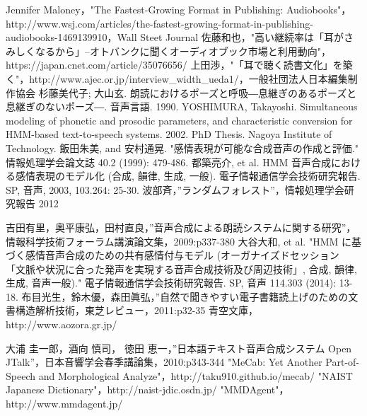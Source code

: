 \begin{thebibliography}{99}

 Jennifer Maloney，"The Fastest-Growing Format in Publishing: Audiobooks"，http://www.wsj.com/articles/the-fastest-growing-format-in-publishing-audiobooks-1469139910，Wall Steet Journal
 佐藤和也，"高い継続率は「耳がさみしくなるから」--オトバンクに聞くオーディオブック市場と利用動向"，https://japan.cnet.com/article/35076656/
 上田渉，"「耳で聴く読書文化」を築く"，http://www.ajec.or.jp/interview\_width\_ueda1/，一般社団法人日本編集制作協会
 杉藤美代子; 大山玄. 朗読におけるポーズと呼吸―息継ぎのあるポーズと息継ぎのないポーズ―. 音声言語. 1990.
 YOSHIMURA, Takayoshi. Simultaneous modeling of phonetic and prosodic parameters, and characteristic conversion for HMM-based text-to-speech systems. 2002. PhD Thesis. Nagoya Institute of Technology.
 飯田朱美, and 安村通晃. "感情表現が可能な合成音声の作成と評価." 情報処理学会論文誌 40.2 (1999): 479-486.
 都築亮介, et al. HMM 音声合成における感情表現のモデル化 (合成, 韻律, 生成, 一般). 電子情報通信学会技術研究報告. SP, 音声, 2003, 103.264: 25-30.
 波部斉，”ランダムフォレスト”，情報処理学会研究報告 2012

 吉田有里，奥平康弘，田村直良，”音声合成による朗読システムに関する研究”，情報科学技術フォーラム講演論文集，2009:p337-380
 大谷大和, et al. "HMM に基づく感情音声合成のための共有感情付与モデル (オーガナイズドセッション 「文脈や状況に合った発声を実現する音声合成技術及び周辺技術」, 合成, 韻律, 生成, 音声一般)." 電子情報通信学会技術研究報告. SP, 音声 114.303 (2014): 13-18.
 布目光生，鈴木優，森田眞弘，”自然で聞きやすい電子書籍読上げのための文書構造解析技術，東芝レビュー，2011:p32-35
 青空文庫，http://www.aozora.gr.jp/

 大浦 圭一郎，酒向 慎司， 徳田 恵一，”日本語テキスト音声合成システム Open JTalk”，日本音響学会春季講論集，2010:p343-344
 "MeCab: Yet Another Part-of-Speech and Morphological Analyze"，http://taku910.github.io/mecab/
 "NAIST Japanese Dictionary"，http://naist-jdic.osdn.jp/
 "MMDAgent"，http://www.mmdagent.jp/


\end{thebibliography}
